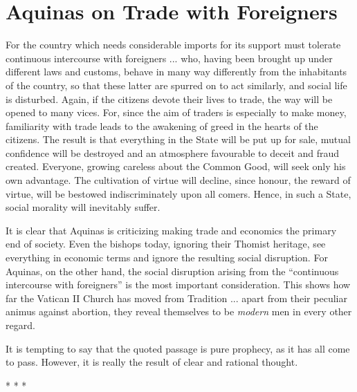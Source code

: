 \section{Aquinas on Trade with Foreigners}

\begin{quotex}
For the country which needs considerable imports for its support must tolerate continuous intercourse with foreigners ... who, having been brought up under different laws and customs, behave in many way differently from the inhabitants of the country, so that these latter are spurred on to act similarly, and social life is disturbed. Again, if the citizens devote their lives to trade, the way will be opened to many vices. For, since the aim of traders is especially to make money, familiarity with trade leads to the awakening of greed in the hearts of the citizens. The result is that everything in the State will be put up for sale, mutual confidence will be destroyed and an atmosphere favourable to deceit and fraud created. Everyone, growing careless about the Common Good, will seek only his own advantage. The cultivation of virtue will decline, since honour, the reward of virtue, will be bestowed indiscriminately upon all comers. Hence, in such a State, social morality will inevitably suffer.
\end{quotex}

It is clear that Aquinas is criticizing making trade and economics the primary end of society. Even the bishops today, ignoring their Thomist heritage, see everything in economic terms and ignore the resulting social disruption. For Aquinas, on the other hand, the social disruption arising from the ``continuous intercourse with foreigners'' is the most important consideration. This shows how far the Vatican II Church has moved from Tradition ... apart from their peculiar animus against abortion, they reveal themselves to be \emph{modern} men in every other regard.

It is tempting to say that the quoted passage is pure prophecy, as it has all come to pass. However, it is really the result of clear and rational thought.



\begin{center}* * *\end{center}

